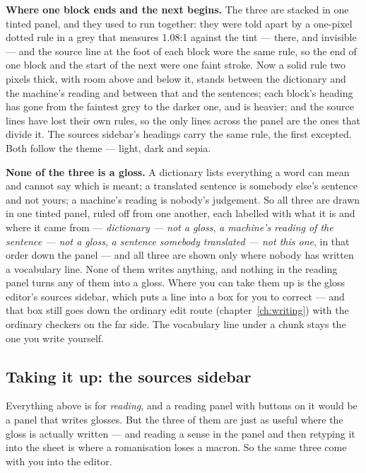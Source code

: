 \documentclass[11pt,oneside]{report}
\newcommand{\menu}[1]{\textsf{#1}}
\begin{document}
\textbf{Where one block ends and the next begins.} The three are stacked in
one tinted panel, and they used to run together: they were told apart by a
one-pixel dotted rule in a grey that measures 1.08:1 against the tint ---
there, and invisible --- and the source line at the foot of each block wore
the same rule, so the end of one block and the start of the next were one
faint stroke. Now a solid rule two pixels thick, with room above and below
it, stands between the dictionary and the machine's reading and between
that and the sentences; each block's heading has gone from the faintest
grey to the darker one, and is heavier; and the source lines have lost their
own rules, so the
only lines across the panel are the ones that divide it. The
\menu{sources} sidebar's headings carry the same rule, the first
excepted. Both follow the theme --- light, dark and sepia.

\begin{warnbox}
\textbf{None of the three is a gloss.} A dictionary lists everything a word
can mean and cannot say which is meant; a translated sentence is somebody
else's sentence and not yours; a machine's reading is nobody's judgement. So
all three are drawn in one tinted panel, ruled off from one another, each
labelled with what it is and where it came from --- \emph{dictionary --- not a gloss},
\emph{a machine's reading of the sentence --- not a gloss}, \emph{a sentence
somebody translated --- not this one}, in that order down the panel --- and
all three are shown only where nobody has written a vocabulary line. None of
them writes anything, and nothing in the reading panel turns any of them into
a gloss. Where you can take them up is the gloss editor's \menu{sources}
sidebar, which puts a line into a box for you to correct --- and that box
still goes down the ordinary edit route (chapter~\ref{ch:writing}) with the
ordinary checkers on the far side. The vocabulary line under a chunk stays
the one you write yourself.
\end{warnbox}

\subsection*{Taking it up: the \menu{sources} sidebar}

Everything above is for \emph{reading}, and a reading panel with buttons on it
would be a panel that writes glosses. But the three of them are just as useful
where the gloss is actually written --- and reading a sense in the panel and
then retyping it into the sheet is where a romanisation loses a macron. So the
same three come with you into the editor.
\end{document}

